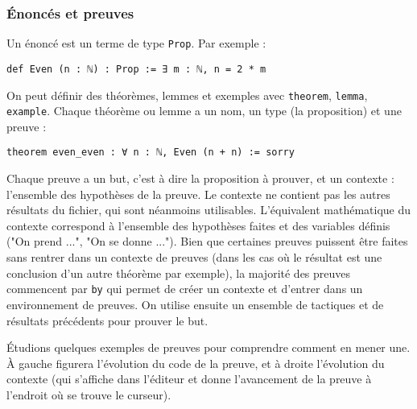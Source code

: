\documentclass[a4paper, 12pt]{article}
\newcommand{\lean}[1]{\texttt{#1}}
\begin{document}
\subsubsection{Énoncés et preuves}

Un énoncé est un terme de type \lean{Prop}. Par exemple :

\begin{verbatim}
def Even (n : ℕ) : Prop := ∃ m : ℕ, n = 2 * m
\end{verbatim}

On peut définir des théorèmes, lemmes et exemples avec \lean{theorem}, \lean{lemma}, \lean{example}. Chaque théorème ou lemme a un nom, un type (la proposition) et une preuve :

\begin{verbatim}
theorem even_even : ∀ n : ℕ, Even (n + n) := sorry
\end{verbatim}

Chaque preuve a un but, c'est à dire la proposition à prouver, et un contexte : l'ensemble des hypothèses de la preuve. Le contexte ne contient pas les autres résultats du fichier, qui sont néanmoins utilisables. L'équivalent mathématique du contexte correspond à l'ensemble des hypothèses faites et des variables définis ("On prend ...", "On se donne ..."). Bien que certaines preuves puissent être faites sans rentrer dans un contexte de preuves (dans les cas où le résultat est une conclusion d'un autre théorème par exemple), la majorité des preuves commencent par \lean{by} qui permet de créer un contexte et d'entrer dans un environnement de preuves. On utilise ensuite un ensemble de tactiques et de résultats précédents pour prouver le but.

Étudions quelques exemples de preuves pour comprendre comment en mener une. À gauche figurera l'évolution du code de la preuve, et à droite l'évolution du contexte (qui s'affiche dans l'éditeur et donne l'avancement de la preuve à l'endroit où se trouve le curseur).
\end{document}
